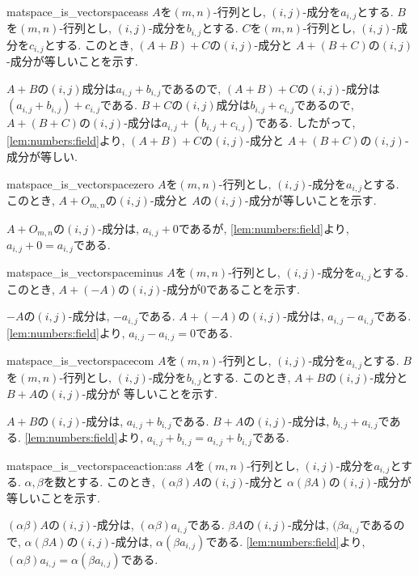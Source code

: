 \begin{proofof*}{matspace_is_vectorspace}{ass}
  $A$を$(m,n)$-行列とし, $(i,j)$-成分を$a_{i,j}$とする.
  $B$を$(m,n)$-行列とし, $(i,j)$-成分を$b_{i,j}$とする.
  $C$を$(m,n)$-行列とし, $(i,j)$-成分を$c_{i,j}$とする.
  このとき,
  $(A+B)+C$の$(i,j)$-成分と
  $A+(B+C)$の$(i,j)$-成分が等しいことを示す.

  $A+B$の$(i,j)$成分は$a_{i,j}+b_{i,j}$であるので,
  $(A+B)+C$の$(i,j)$-成分は$(a_{i,j}+b_{i,j})+c_{i,j}$である.
  $B+C$の$(i,j)$成分は$b_{i,j}+c_{i,j}$であるので,
  $A+(B+C)$の$(i,j)$-成分は$a_{i,j}+(b_{i,j}+c_{i,j})$である.
  したがって, \cref{lem:numbers:field}より,
  $(A+B)+C$の$(i,j)$-成分と
  $A+(B+C)$の$(i,j)$-成分が等しい.
  
  
\end{proofof*}

\begin{proofof*}{matspace_is_vectorspace}{zero}
  $A$を$(m,n)$-行列とし, $(i,j)$-成分を$a_{i,j}$とする.
  このとき,
  $A+O_{m,n}$の$(i,j)$-成分と
  $A$の$(i,j)$-成分が等しいことを示す.

  $A+O_{m,n}$の$(i,j)$-成分は, $a_{i,j}+0$であるが,
  \cref{lem:numbers:field}より,
  $a_{i,j}+0=a_{i,j}$である.
\end{proofof*}

\begin{proofof*}{matspace_is_vectorspace}{minus}
  $A$を$(m,n)$-行列とし, $(i,j)$-成分を$a_{i,j}$とする.
  このとき,
  $A+(-A)$の$(i,j)$-成分が$0$であることを示す.

  $-A$の$(i,j)$-成分は, $-a_{i,j}$である.
  $A+(-A)$の$(i,j)$-成分は, $a_{i,j}-a_{i,j}$である.
  \cref{lem:numbers:field}より,
  $a_{i,j}-a_{i,j}=0$である.
\end{proofof*}

\begin{proofof*}{matspace_is_vectorspace}{com}
  $A$を$(m,n)$-行列とし, $(i,j)$-成分を$a_{i,j}$とする.
  $B$を$(m,n)$-行列とし, $(i,j)$-成分を$b_{i,j}$とする.
  このとき,
  $A+B$の$(i,j)$-成分と
  $B+A$の$(i,j)$-成分が
  等しいことを示す.
  
  $A+B$の$(i,j)$-成分は, $a_{i,j}+b_{i,j}$である.
  $B+A$の$(i,j)$-成分は, $b_{i,j}+a_{i,j}$である.
  \cref{lem:numbers:field}より,
  $a_{i,j}+b_{i,j}=a_{i,j}+b_{i,j}$である.
\end{proofof*}
\begin{proofof*}{matspace_is_vectorspace}{action:ass}
  $A$を$(m,n)$-行列とし, $(i,j)$-成分を$a_{i,j}$とする.
  $\alpha,\beta$を数とする.
  このとき,
  $(\alpha\beta)A$の$(i,j)$-成分と
  $\alpha(\beta A)$の$(i,j)$-成分が
  等しいことを示す.

  $(\alpha\beta)A$の$(i,j)$-成分は, $(\alpha\beta)a_{i,j}$である.
  $\beta A$の$(i,j)$-成分は, $(\beta a_{i,j}$であるので,
  $\alpha(\beta A)$の$(i,j)$-成分は, $\alpha(\beta a_{i,j})$である.
  \cref{lem:numbers:field}より,
  $(\alpha\beta)a_{i,j}=\alpha(\beta a_{i,j})$である.
\end{proofof*}

